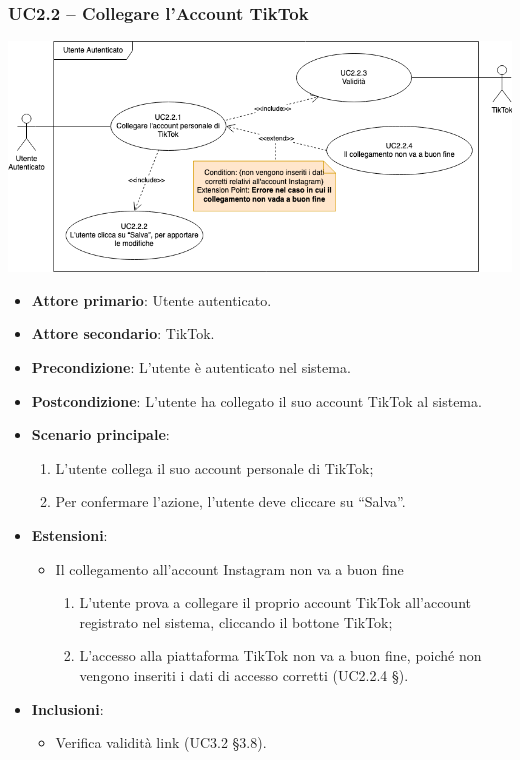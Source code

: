 \subsubsection{UC2.2 – Collegare l'Account TikTok}
\begin{center}
\includegraphics[scale=0.5]{UC_images/UC2_2.png}
\end{center}
\begin{itemize}
\item \textbf{Attore primario}: Utente autenticato.
\item \textbf{Attore secondario}: TikTok.
\item \textbf{Precondizione}: L’utente è autenticato nel sistema.
\item \textbf{Postcondizione}: L’utente ha collegato il suo account TikTok al sistema.

\item \textbf{Scenario principale}:
\begin{enumerate}
\item L’utente collega il suo account personale di TikTok;
\item Per confermare l’azione, l’utente deve cliccare su “Salva”. 
\end{enumerate}

\item \textbf{Estensioni}:
\begin{itemize}
\item Il collegamento all’account Instagram non va a buon fine
\begin{enumerate}
	\item L’utente prova a collegare il proprio account TikTok all’account registrato nel sistema, cliccando il bottone TikTok;
	\item L’accesso alla piattaforma TikTok non va a buon fine, poiché non vengono inseriti i dati di accesso corretti (UC2.2.4 §).
\end{enumerate}
\end{itemize}

\item \textbf{Inclusioni}:
\begin{itemize}
\item Verifica validità link (UC3.2 §3.8).
\end{itemize}
\end{itemize}


